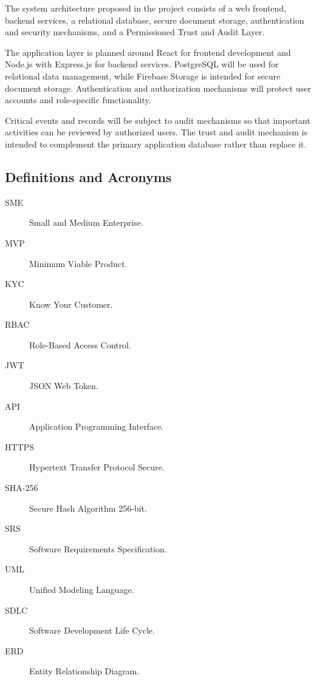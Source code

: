 The system architecture proposed in the project consists of a web
frontend, backend services, a relational database, secure document
storage, authentication and security mechanisms, and a Permissioned Trust
and Audit Layer.

The application layer is planned around React for frontend development and
Node.js with Express.js for backend services. PostgreSQL will be used for
relational data management, while Firebase Storage is intended for secure
document storage. Authentication and authorization mechanisms will protect
user accounts and role-specific functionality.

Critical events and records will be subject to audit mechanisms so that
important activities can be reviewed by authorized users. The trust and
audit mechanism is intended to complement the primary application database
rather than replace it.


\subsection{Definitions and Acronyms}

\begin{description}

    \item[SME] Small and Medium Enterprise.

    \item[MVP] Minimum Viable Product.

    \item[KYC] Know Your Customer.

    \item[RBAC] Role-Based Access Control.

    \item[JWT] JSON Web Token.

    \item[API] Application Programming Interface.

    \item[HTTPS] Hypertext Transfer Protocol Secure.

    \item[SHA-256] Secure Hash Algorithm 256-bit.

    \item[SRS] Software Requirements Specification.

    \item[UML] Unified Modeling Language.

    \item[SDLC] Software Development Life Cycle.

    \item[ERD] Entity Relationship Diagram.

\end{description}


